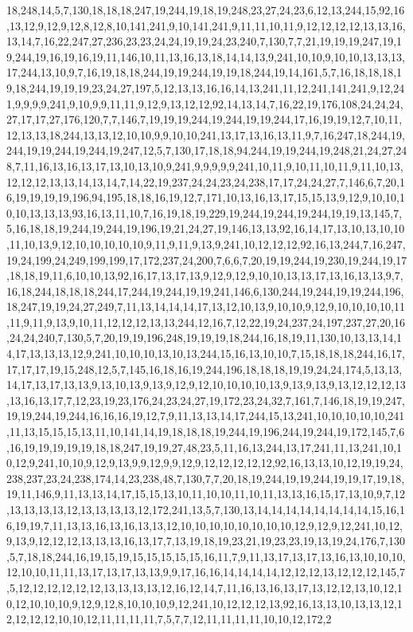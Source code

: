 18,248,14,5,7,130,18,18,18,247,19,244,19,18,19,248,23,27,24,23,6,12,13,244,15,92,16,13,12,9,12,9,12,8,12,8,10,141,241,9,10,141,241,9,11,11,10,11,9,12,12,12,12,13,13,16,13,14,7,16,22,247,27,236,23,23,24,24,19,19,24,23,240,7,130,7,7,21,19,19,19,247,19,19,244,19,16,19,16,19,11,146,10,11,13,16,13,18,14,14,13,9,241,10,10,9,10,10,13,13,13,17,244,13,10,9,7,16,19,18,18,244,19,19,244,19,19,18,244,19,14,161,5,7,16,18,18,18,19,18,244,19,19,19,23,24,27,197,5,12,13,13,16,16,14,13,241,11,12,241,141,241,9,12,241,9,9,9,9,241,9,10,9,9,11,11,9,12,9,13,12,12,92,14,13,14,7,16,22,19,176,108,24,24,24,27,17,17,27,176,120,7,7,146,7,19,19,19,244,19,244,19,19,244,17,16,19,19,12,7,10,11,12,13,13,18,244,13,13,12,10,10,9,9,10,10,241,13,17,13,16,13,11,9,7,16,247,18,244,19,244,19,19,244,19,244,19,247,12,5,7,130,17,18,18,94,244,19,19,244,19,248,21,24,27,248,7,11,16,13,16,13,17,13,10,13,10,9,241,9,9,9,9,9,241,10,11,9,10,11,10,11,9,11,10,13,12,12,12,13,13,14,13,14,7,14,22,19,237,24,24,23,24,238,17,17,24,24,27,7,146,6,7,20,16,19,19,19,19,196,94,195,18,18,16,19,12,7,171,10,13,16,13,17,15,15,13,9,12,9,10,10,10,10,13,13,13,93,16,13,11,10,7,16,19,18,19,229,19,244,19,244,19,244,19,19,13,145,7,5,16,18,18,19,244,19,244,19,196,19,21,24,27,19,146,13,13,92,16,14,17,13,10,13,10,10,11,10,13,9,12,10,10,10,10,10,9,11,9,11,9,13,9,241,10,12,12,12,92,16,13,244,7,16,247,19,24,199,24,249,199,199,17,172,237,24,200,7,6,6,7,20,19,19,244,19,230,19,244,19,17,18,18,19,11,6,10,10,13,92,16,17,13,17,13,9,12,9,12,9,10,10,13,13,17,13,16,13,13,9,7,16,18,244,18,18,18,244,17,244,19,244,19,19,241,146,6,130,244,19,244,19,19,244,196,18,247,19,19,24,27,249,7,11,13,14,14,14,17,13,12,10,13,9,10,10,9,12,9,10,10,10,10,11,11,9,11,9,13,9,10,11,12,12,12,13,13,244,12,16,7,12,22,19,24,237,24,197,237,27,20,16,24,24,240,7,130,5,7,20,19,19,196,248,19,19,19,18,244,16,18,19,11,130,10,13,13,14,14,17,13,13,13,12,9,241,10,10,10,13,10,13,244,15,16,13,10,10,7,15,18,18,18,244,16,17,17,17,17,19,15,248,12,5,7,145,16,18,16,19,244,196,18,18,18,19,19,24,24,174,5,13,13,14,17,13,17,13,13,9,13,10,13,9,13,9,12,9,12,10,10,10,10,13,9,13,9,13,9,13,12,12,12,13,13,16,13,17,7,12,23,19,23,176,24,23,24,27,19,172,23,24,32,7,161,7,146,18,19,19,247,19,19,244,19,244,16,16,16,19,12,7,9,11,13,13,14,17,244,15,13,241,10,10,10,10,10,241,11,13,15,15,15,13,11,10,141,14,19,18,18,18,19,244,19,196,244,19,244,19,172,145,7,6,16,19,19,19,19,19,18,18,247,19,19,27,48,23,5,11,16,13,244,13,17,241,11,13,241,10,10,12,9,241,10,10,9,12,9,13,9,9,12,9,9,12,9,12,12,12,12,12,92,16,13,13,10,12,19,19,24,238,237,23,24,238,174,14,23,238,48,7,130,7,7,20,18,19,244,19,19,244,19,19,17,19,18,19,11,146,9,11,13,13,14,17,15,15,13,10,11,10,10,11,10,11,13,13,16,15,17,13,10,9,7,12,13,13,13,13,12,13,13,13,13,12,172,241,13,5,7,130,13,14,14,14,14,14,14,14,14,15,16,16,19,19,7,11,13,13,16,13,16,13,13,12,10,10,10,10,10,10,10,10,12,9,12,9,12,241,10,12,9,13,9,12,12,12,13,13,13,16,13,17,7,13,19,18,19,23,21,19,23,23,19,13,19,24,176,7,130,5,7,18,18,244,16,19,15,19,15,15,15,15,15,16,11,7,9,11,13,17,13,17,13,16,13,10,10,10,12,10,10,11,11,13,17,13,17,13,13,9,9,17,16,16,14,14,14,14,12,12,12,13,12,12,12,145,7,5,12,12,12,12,12,12,13,13,13,13,12,16,12,14,7,11,16,13,16,13,17,13,12,12,13,10,12,10,12,10,10,10,9,12,9,12,8,10,10,10,9,12,241,10,12,12,12,13,92,16,13,13,10,13,13,12,12,12,12,12,10,10,12,11,11,11,11,7,5,7,7,12,11,11,11,11,10,10,12,172,2
